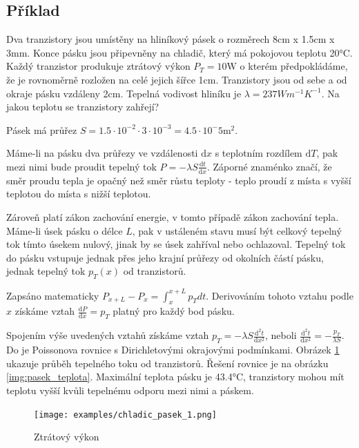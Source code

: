 \documentclass{book}
\begin{document}
\subsection{Příklad}
\label{sec:priklad_chladic_pasek}

Dva tranzistory jsou umístěny na hliníkový pásek o rozměrech 8cm x 1.5cm x 3mm. Konce pásku jsou připevněny
na chladič, který má pokojovou teplotu 20\si{\degree}C. Každý tranzistor produkuje ztrátový výkon \(P_T = 10\mathrm{W}\) o kterém předpokládáme,
že je rovnoměrně rozložen na celé jejich šířce 1cm. Tranzistory jsou od sebe a od okraje pásku vzdáleny 2cm.
Tepelná vodivost hliníku je \(\lambda = 237 W m^{-1} K^{-1}\). Na jakou teplotu se tranzistory zahřejí?

Pásek má průřez \(S = 1.5 \cdot 10^{-2} \cdot 3 \cdot 10^{-3} = 4.5 \cdot 10^-5 \mathrm{m^2}\).

Máme-li na pásku dva průřezy ve vzdálenosti \(\mathrm{d}x\) s teplotním rozdílem \(\mathrm{d}T\), pak mezi nimi bude proudit
tepelný tok \(P = -\lambda S \frac{\mathrm{d}t}{\mathrm{d}x}\). Záporné znaménko značí, že směr proudu tepla je opačný než směr růstu
teploty - teplo proudí z místa s vyšší teplotou do místa s nižší teplotou.

Zároveň platí zákon zachování energie, v tomto případě zákon zachování tepla. Máme-li úsek pásku o délce \(L\), pak
v ustáleném stavu musí být celkový tepelný tok tímto úsekem nulový, jinak by se úsek zahříval nebo ochlazoval.
Tepelný tok do pásku vstupuje jednak přes jeho krajní průřezy od okolních částí pásku, jednak tepelný tok \(p_T(x)\) od tranzistorů.

Zapsáno matematicky \(P_{x+L} - P_{x} = \int_{x}^{x+L} p_T dt\). Derivováním tohoto vztahu podle \(x\) získáme vztah
\(\frac{\mathrm{d}P}{\mathrm{d}x} = p_T\) platný pro každý bod pásku.

Spojením výše uvedených vztahů získáme vztah \(p_T = -\lambda S \frac{\mathrm{d}^2 t}{\mathrm{d}x^2}\), neboli \(\frac{\mathrm{d}^2 t}{\mathrm{d}x^2} = -\frac{p_T}{\lambda S}\). Do je Poissonova rovnice s Dirichletovými okrajovými podmínkami. Obrázek \ref{img:pasek_vykon} ukazuje průběh tepelného toku
od tranzistorů. Řešení rovnice je na obrázku \ref{img:pasek_teplota}. Maximální teplota pásku je 43.4\si{\degree}C, tranzistory mohou mít teplotu vyšší
kvůli tepelnému odporu mezi nimi a páskem.

\begin{figure}
	\texttt{[image: examples/chladic\_pasek\_1.png]}
	\caption{Ztrátový výkon}
	\label{img:pasek_vykon}
\end{figure}
\end{document}
